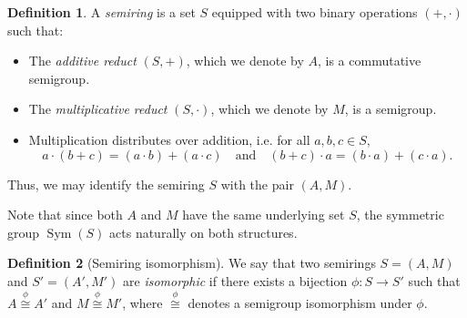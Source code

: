 \documentclass{article}
\theoremstyle{definition}
\newtheorem{definition}{Definition}
\begin{document}
\begin{definition}
    A \emph{semiring} is a set \(S\) equipped with two binary operations \((+, \cdot)\) such that:
    \begin{itemize}
        \item The \emph{additive reduct} \((S, +)\), which we denote by \(A\), is a commutative semigroup.
        \item The \emph{multiplicative reduct} \((S, \cdot)\), which we denote by \(M\), is a semigroup.
        \item Multiplication distributes over addition, i.e. for all \(a, b, c \in S\),
        \[
        a \cdot (b + c) = (a \cdot b) + (a \cdot c) \quad \text{and} \quad (b + c) \cdot a = (b \cdot a) + (c \cdot a).
        \]
    \end{itemize}
    Thus, we may identify the semiring \(S\) with the pair \((A, M)\).
    \end{definition}
    Note that since both \(A\) and \(M\) have the same underlying set \(S\), the symmetric group \(\operatorname{Sym}(S)\) acts naturally on both structures.
    \begin{definition}[Semiring isomorphism]
        We say that two semirings \(S = (A, M)\) and \(S' = (A', M')\) are \emph{isomorphic} if there exists a bijection \(\phi: S \to S'\) such that \(A \overset{\phi}\cong A'\) and \(M \overset{\phi}\cong M'\), where \(\overset{\phi}\cong\) denotes a semigroup isomorphism under \(\phi\).
    \end{definition}
\end{document}
